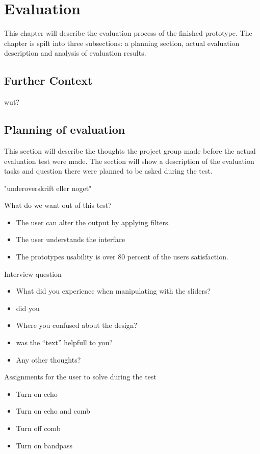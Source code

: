 \chapter{Evaluation}\label{ch:evaluation}
This chapter will describe the evaluation process of the finished prototype. The chapter is spilt into three subsections: a planning section, actual evaluation description and analysis of evaluation results. 

\section{Further Context}\label{sec:furthercontext}
 wut?

\section{Planning of evaluation}
This section will describe the thoughts the project group made before the actual evaluation test were made. The section will show a description of the evaluation tasks and question there were planned to be asked during the test. 

"underoverskrift eller noget" 

What do we want out of this test?

\begin{itemize}
\item The user can alter the output by applying filters.
\item The user understands the interface  
\item The prototypes usability is over 80 percent of the users satisfaction.
\end{itemize}

Interview question 
\begin{itemize}
\item What did you experience when manipulating with the sliders?
\item did you 
\item Where you confused about the design?
\item was the “text” helpfull to you?
\item Any other thoughts?
\end{itemize}

Assignments for the user to solve during the test 
\begin{itemize}
\item Turn on echo
\item Turn on echo and comb
\item Turn off comb
\item Turn on bandpass 
\end{itemize}

